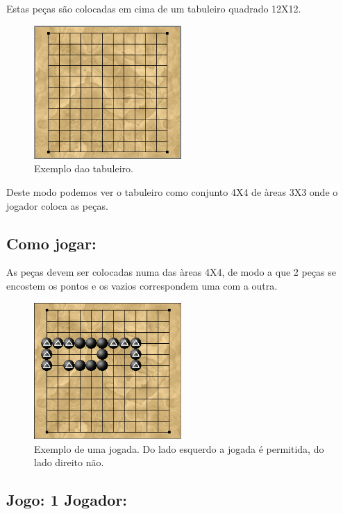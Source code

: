 \documentclass[a4paper]{article}
\begin{document}
Estas peças são colocadas em cima de um tabuleiro quadrado 12X12.

\begin{figure}[h!]
  \centering
      \includegraphics[width=0.5\textwidth]{Board}
  \caption{Exemplo dao tabuleiro.}
\end{figure}

Deste modo podemos ver o tabuleiro como conjunto 4X4 de àreas 3X3 onde o jogador coloca as peças.

\subsection{Como jogar:}

As peças devem ser colocadas numa das àreas 4X4, de modo a que 2 peças se encostem os pontos e os vazios correspondem uma com a outra.

\begin{figure}[h!]
  \centering
      \includegraphics[width=0.5\textwidth]{Example}
  \caption{Exemplo de uma jogada. Do lado esquerdo a jogada é permitida, do lado direito não.}
\end{figure}

\subsection{Jogo: 1 Jogador:}
\end{document}
